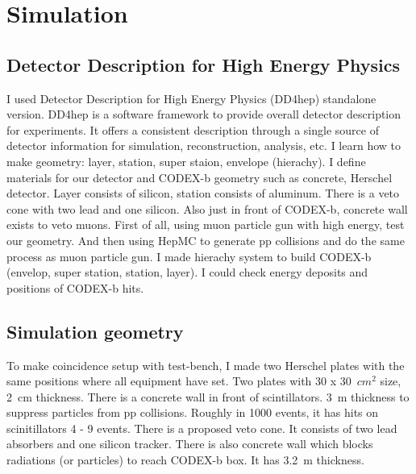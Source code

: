 \section{Simulation}
\label{sec:Simulation}

\subsection{Detector Description for High Energy Physics}
I used Detector Description for High Energy Physics (DD4hep) standalone version.
DD4hep is a software framework to provide overall detector description for experiments.
It offers a consistent description through a single source of detector information for simulation, reconstruction, analysis, etc.
I learn how to make geometry: layer, station, super staion, envelope (hierachy).
I define materials for our detector and CODEX-b geometry such as concrete, Herschel detector.
Layer consists of silicon, station consists of aluminum. 
There is a veto cone with two lead and one silicon. 
Also just in front of CODEX-b, concrete wall exists to veto muons.
First of all, using muon particle gun with high energy, test our geometry.
And then using HepMC to generate pp collisions and do the same process as muon particle gun.
I made hierachy system to build CODEX-b (envelop, super station, station, layer).
I could check energy deposits and positions of CODEX-b hits.


\subsection{Simulation geometry}
To make coincidence setup with test-bench, I made two Herschel plates with the same positions where all equipment have set.
Two plates with 30 x 30~$cm^{2}$ size, 2~cm thickness.
There is a concrete wall in front of scintillators.
3~m thickness to suppress particles from pp collisions.
Roughly in 1000 events, it has hits on scinitillators 4 - 9 events.
There is a proposed veto cone. It consists of two lead absorbers and one silicon tracker.
There is also concrete wall which blocks radiations (or particles) to reach CODEX-b box. 
It has 3.2~m thickness.

